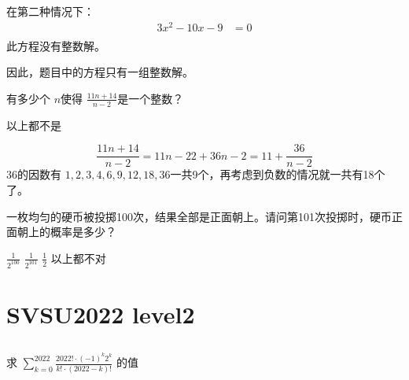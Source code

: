 \begin{questions}
\begin{solution}
		在第二种情况下：
		\begin{align*}
			3x^2 - 10x - 9 & = 0 \\
		\end{align*}
		此方程没有整数解。

		因此，题目中的方程只有一组整数解。
	\end{solution}

	\question 有多少个 \( n \)使得 \( \displaystyle\frac{11n+14}{n-2} \)是一个整数？

	\begin{oneparchoices}
	    \choice 以上都不是
	\end{oneparchoices}

	\begin{solution}
	\begin{equation*}
		\frac{11n + 14}{n-2} = {11n - 22 + 36}{n-2} = 11 + \frac{36}{n-2}
	\end{equation*}
	\( 36 \)的因数有 \( 1,2,3,4,6,9,12,18,36 \)一共9个，再考虑到负数的情况就一共有18个了。
	\end{solution}

	\question 一枚均匀的硬币被投掷100次，结果全部是正面朝上。请问第101次投掷时，硬币正面朝上的概率是多少？

	\begin{oneparchoices}
		 \choice \( \frac{1}{2^{100}} \) \choice \( \frac{1}{2^{101}} \) \CorrectChoice \( \frac{1}{2} \) \choice 以上都不对
	\end{oneparchoices}

\end{questions}
\section{SVSU2022 level2}
\subsection{}
求
$\displaystyle\sum_{k=0}^{2022}\frac{2022!\cdot (-1)^k2^k}{k! \cdot (2022-k)!}$
的值

